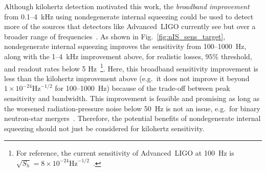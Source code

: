 Although kilohertz detection motivated this work, the \emph{broadband improvement} from 0.1--4~kHz using nondegenerate internal squeezing could be used to detect more of the sources that detectors like Advanced~LIGO currently see but over a broader range of frequencies~\cite{GWTC-2:2020}. %
As shown in Fig.~\ref{fig:nIS_sens_target}, nondegenerate internal squeezing improves the sensitivity from 100--1000~Hz, along with the 1--4~kHz improvement above, for realistic losses, $95\%$ threshold, and readout rates below 5 Hz~\footnote{For reference, the current sensitivity of Advanced~LIGO at 100~Hz is $\sqrt{S_h}=8\times10^{-24}\text{Hz}^{-1/2}$~\cite{PhysRevD.93.112004}.}. Here, this broadband sensitivity improvement is less than the kilohertz improvement above (e.g.\ it does not improve it beyond $1\times10^{-24}\text{Hz}^{-1/2}$ for 100--1000~Hz) because of the trade-off between peak sensitivity and bandwidth. This improvement is feasible and promising as long as the worsened radiation-pressure noise below 50~Hz is not an issue, e.g.\ for binary neutron-star mergers~\cite{miaoDesignGravitationalWaveDetectors2018}. Therefore, the potential benefits of nondegenerate internal squeezing should not just be considered for kilohertz sensitivity.




